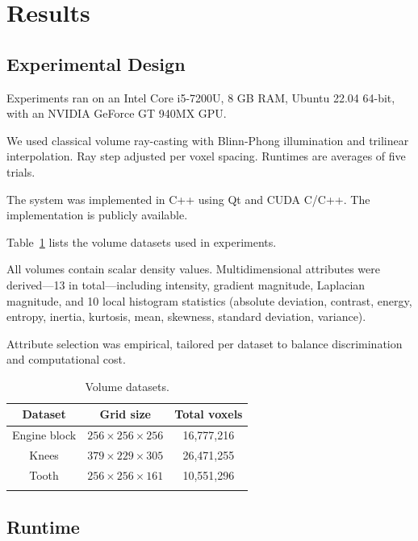 \section{Results}
\label{sect:results}

\subsection{Experimental Design}
\label{subsect:experimental-design}

Experiments ran on an Intel Core i5-7200U, 8 GB RAM, Ubuntu 22.04 64-bit, with an NVIDIA GeForce GT 940MX GPU.

We used classical volume ray-casting with Blinn-Phong illumination and trilinear interpolation. Ray step adjusted per voxel spacing. Runtimes are averages of five trials.

The system was implemented in C++ using Qt and CUDA C/C++. The implementation is publicly available.

Table~\ref{tab:datasets-descriptions} lists the volume datasets used in experiments.

All volumes contain scalar density values. Multidimensional attributes were derived—13 in total—including intensity, gradient magnitude, Laplacian magnitude, and 10 local histogram statistics (absolute deviation, contrast, energy, entropy, inertia, kurtosis, mean, skewness, standard deviation, variance).

Attribute selection was empirical, tailored per dataset to balance discrimination and computational cost.

\begin{table}[htb!]
    \centering
    \caption{Volume datasets.}
    \begin{tabular}{@{}ccc@{}}
        \toprule
        \textbf{Dataset} & \textbf{Grid size} & \textbf{Total voxels} \\ 
        \midrule
        Engine block & $256 \times 256 \times 256$ & 16,777,216\\
        Knees & $379 \times 229 \times 305$ & 26,471,255\\
        Tooth & $256 \times 256 \times 161$ & 10,551,296\\
        \bottomrule
        \label{tab:datasets-descriptions}
    \end{tabular}
\end{table}

\subsection{Runtime}
\label{subsect:runtime-analysis}

